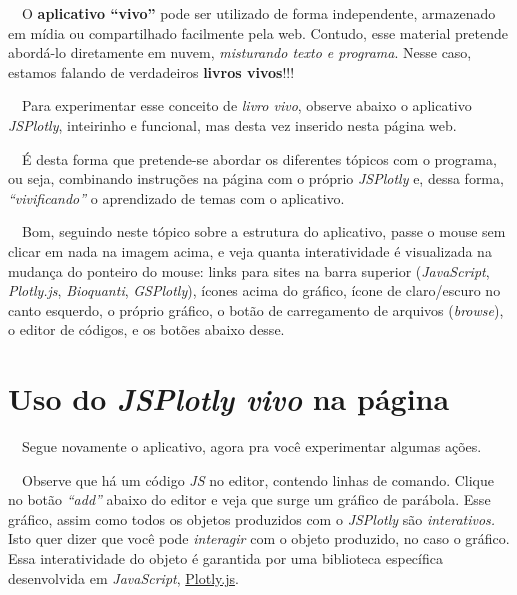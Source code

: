 \documentclass[
  portuguese,
  letterpaper,
  DIV=11,
  numbers=noendperiod]{scrreprt}
\begin{document}
\hfill\break

~~O \textbf{aplicativo ``vivo''} pode ser utilizado de forma
independente, armazenado em mídia ou compartilhado facilmente pela web.
Contudo, esse material pretende abordá-lo diretamente em nuvem,
\emph{{misturando texto e programa}}. Nesse caso, estamos falando de
verdadeiros \textbf{{livros vivos}}!!!

\hfill\break

~~Para experimentar esse conceito de \emph{livro vivo}, observe abaixo o
aplicativo \emph{JSPlotly}, inteirinho e funcional, mas desta vez
inserido nesta página web.

\hfill\break

\hfill\break

~~É desta forma que pretende-se abordar os diferentes tópicos com o
programa, ou seja, combinando instruções na página com o próprio
\emph{JSPlotly} e, dessa forma, \emph{``vivificando''} o aprendizado de
temas com o aplicativo.

\hfill\break

~~Bom, seguindo neste tópico sobre a estrutura do aplicativo, passe o
mouse sem clicar em nada na imagem acima, e veja quanta interatividade é
visualizada na mudança do ponteiro do mouse: links para sites na barra
superior (\emph{JavaScript}, \emph{Plotly.js}, \emph{Bioquanti},
\emph{GSPlotly}), ícones acima do gráfico, ícone de claro/escuro no
canto esquerdo, o próprio gráfico, o botão de carregamento de arquivos
(\emph{browse}), o editor de códigos, e os botões abaixo desse.

\hfill\break

\section{\texorpdfstring{Uso do \emph{JSPlotly vivo} na
página}{Uso do JSPlotly vivo na página}}\label{uso-do-jsplotly-vivo-na-puxe1gina}

~~Segue novamente o aplicativo, agora pra você experimentar algumas
ações.

\hfill\break

\hfill\break

~~Observe que há um código \emph{JS} no editor, contendo linhas de
comando. Clique no botão \emph{``add''} abaixo do editor e veja que
surge um gráfico de parábola. Esse gráfico, assim como todos os objetos
produzidos com o \emph{JSPlotly} são \emph{interativos.} Isto quer dizer
que você pode \emph{interagir} com o objeto produzido, no caso o
gráfico. Essa interatividade do objeto é garantida por uma biblioteca
específica desenvolvida em \emph{JavaScript},
\href{https://plotly.com/javascript/}{Plotly.js}.
\end{document}
